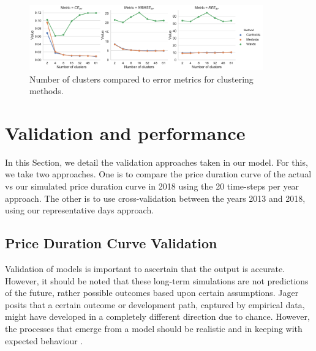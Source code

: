 

\begin{figure}
	\centering
	\includegraphics[width=0.9\textwidth]{Chapter4/figures/clusters_compared_wards.pdf}
	\caption{Number of clusters compared to error metrics for clustering methods.}
	\label{fig:error_metrics_vs_cluster_number}
\end{figure}





\section{Validation and performance}
\label{elecsim:sec:validation}

In this Section, we detail the validation approaches taken in our model. For this, we take two approaches. One is to compare the price duration curve of the actual vs our simulated price duration curve in 2018 using the 20 time-steps per year approach. The other is to use cross-validation between the years 2013 and 2018, using our representative days approach.


\subsection{Price Duration Curve Validation}

Validation of models is important to ascertain that the output is accurate. However, it should be noted that these long-term simulations are not predictions of the future, rather possible outcomes based upon certain assumptions. Jager posits that a certain outcome or development path, captured by empirical data, might have developed in a completely different direction due to chance. However, the processes that emerge from a model should be realistic and in keeping with expected behaviour \cite{Jager2006a}.

